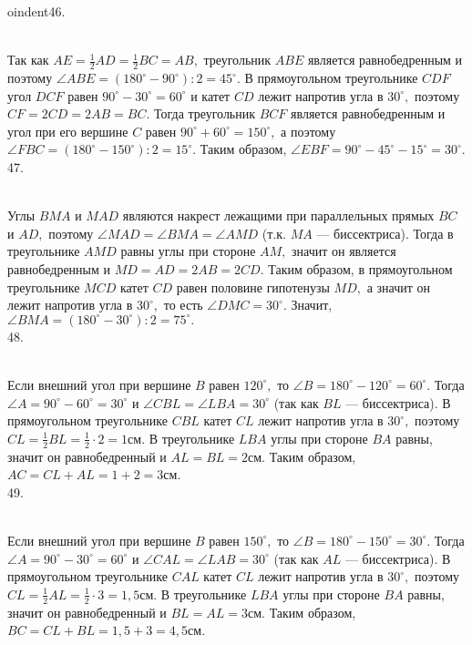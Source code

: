 oindent46. \begin{figure}[ht!]
\end{figure}\\
Так как $AE=\frac{1}{2}AD=\frac{1}{2}BC=AB,$ треугольник $ABE$ является равнобедренным и поэтому $\angle ABE=(180^\circ-90^\circ):2=45^\circ.$ В прямоугольном треугольнике $CDF$ угол $DCF$ равен $90^\circ-30^\circ=60^\circ$ и катет $CD$ лежит напротив угла в $30^\circ,$ поэтому $CF=2CD=2AB=BC.$ Тогда треугольник $BCF$ является равнобедренным и угол при его вершине $C$ равен $90^\circ+60^\circ=150^\circ,$ а поэтому $\angle FBC=(180^\circ-150^\circ):2=15^\circ.$ Таким образом, $\angle EBF=90^\circ-45^\circ-15^\circ=30^\circ.$\\
47. \begin{figure}[ht!]
\end{figure}\\
Углы $BMA$ и $MAD$ являются накрест лежащими при параллельных прямых $BC$ и $AD,$ поэтому $\angle MAD=\angle BMA=\angle AMD$ (т.к. $MA$ --- биссектриса). Тогда в треугольнике $AMD$ равны углы при стороне $AM,$ значит он является равнобедренным и $MD=AD=2AB=2CD.$ Таким образом, в прямоугольном треугольнике $MCD$ катет $CD$ равен половине гипотенузы $MD,$ а значит он лежит напротив угла в $30^\circ,$ то есть $\angle DMC=30^\circ.$ Значит, $\angle BMA=(180^\circ-30^\circ):2=75^\circ.$\\
48. \begin{figure}[ht!]
\end{figure}\\
Если внешний угол при вершине $B$ равен $120^\circ,$ то $\angle B=180^\circ-120^\circ=60^\circ.$ Тогда $\angle A=90^\circ-60^\circ=30^\circ$ и $\angle CBL=\angle LBA=30^\circ$ (так как $BL$ --- биссектриса). В прямоугольном треугольнике $CBL$ катет $CL$ лежит напротив угла в $30^\circ,$ поэтому $CL=\frac{1}{2}BL=\frac{1}{2}\cdot2=1$см. В треугольнике $LBA$ углы при стороне $BA$ равны, значит он равнобедренный и $AL=BL=2$см. Таким образом, $AC=CL+AL=1+2=3$см.\\
49. \begin{figure}[ht!]
\end{figure}\\
Если внешний угол при вершине $B$ равен $150^\circ,$ то $\angle B=180^\circ-150^\circ=30^\circ.$ Тогда $\angle A=90^\circ-30^\circ=60^\circ$ и $\angle CAL=\angle LAB=30^\circ$ (так как $AL$ --- биссектриса). В прямоугольном треугольнике $CAL$ катет $CL$ лежит напротив угла в $30^\circ,$ поэтому $CL=\frac{1}{2}AL=\frac{1}{2}\cdot3=1,5$см. В треугольнике $LBA$ углы при стороне $BA$ равны, значит он равнобедренный и $BL=AL=3$см. Таким образом, $BC=CL+BL=1,5+3=4,5$см.\\
